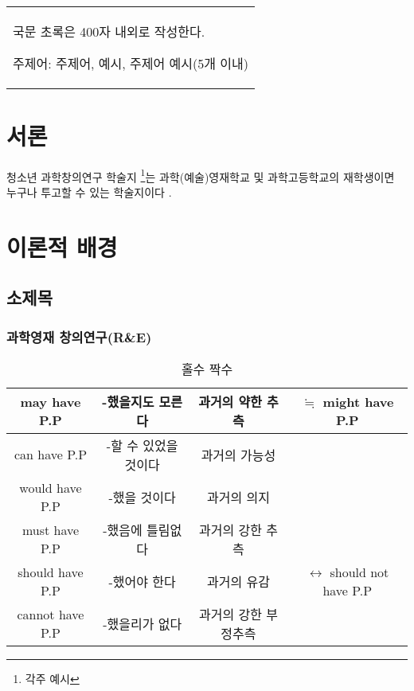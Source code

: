 \documentclass[10pt]{article}
\begin{document}
\begin{center}
	\fontsize{16pt}{16pt}\selectfont{\bf R\&E 과제명(국문)}\\
	\fontsize{10pt}{10pt}\selectfont{ 저자명 \textperiodcentered  저자명 \\}
	\fontsize{10pt}{10pt}\selectfont{ 경기과학고등학교 \\}
	\vspace{0.6cm}
	\fontsize{16pt}{16pt}\selectfont{\bf Title(English) \\}
	\fontsize{10pt}{10pt}\selectfont{ author name \textperiodcentered  author name \\}
	\fontsize{10pt}{10pt}\selectfont{ Gyeonggi Science High School \\}
	\vspace{1cm}
	\fontsize{12pt}{12pt}\selectfont{\bf 국문 초록 \\}
\end{center}
\begin{table}[h]
	\begin{tabular}{p{\textwidth}}
		\hline
		국문 초록은 400자 내외로 작성한다.  
		
		주제어: 주제어, 예시, 주제어 예시(5개 이내)
		\hline
	\end{tabular}
\end{table}
\section{서론}
청소년 과학창의연구 학술지 \footnote{각주 예시}는 과학(예술)영재학교 및 과학고등학교의 재학생이면 누구나 투고할 수 있는 학술지이다 \cite{song}.
\section{이론적 배경}
\subsection{소제목}
\subsubsection{과학영재 창의연구(R\&E)}
\lipsum[1]
\begin{table}[h]
	\centering
	\caption{홀수 짝수}
	\label{oddeven}
	\begin{tabular}{|c||c|c|c|}
		\hline
		may have P.P & -했을지도 모른다 & 과거의 약한 추측 & $\fallingdotseq$ might have P.P\\
		\hline
		can have P.P & -할 수 있었을 것이다 & 과거의 가능성 & \\
		\hline
		would have P.P & -했을 것이다 & 과거의 의지 & \\
		\hline
		must have P.P & -했음에 틀림없다 & 과거의 강한 추측 & \\
		\hline
		should have P.P & -했어야 한다 & 과거의 유감 & $\longleftrightarrow$ should not have P.P \\
		\hline
		cannot have P.P & -했을리가 없다 & 과거의 강한 부정추측 & \\
		\hline
	\end{tabular}
\end{table}
\end{document}
